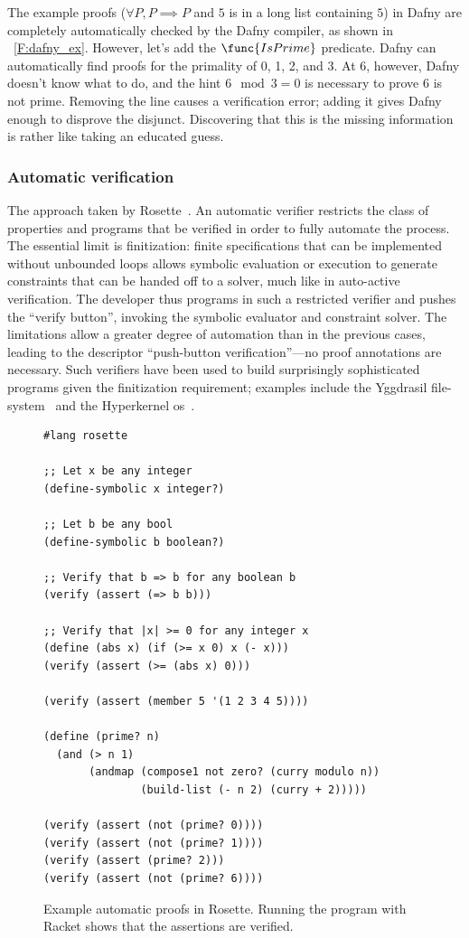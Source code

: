 The example proofs (\(\forall P, P \implies P\) and \(5\) is in a long list
containing \(5\)) in Dafny are completely automatically checked by the Dafny
compiler, as shown in \figurename~\ref{F:dafny_ex}. However, let's add the
\(\func{IsPrime}\) predicate. Dafny can automatically find proofs for the
primality of 0, 1, 2, and 3. At 6, however, Dafny doesn't know what to do, and
the hint \(6 \mod 3 = 0\) is necessary to prove 6 is not prime. Removing the
line causes a verification error; adding it gives Dafny enough to disprove the
disjunct. Discovering that this is the missing information is rather like taking
an educated guess.

\subsubsection{Automatic verification}

The approach taken by Rosette~\cite{Torlak_2013}. An automatic verifier
restricts the class of properties and programs that be verified in order to
fully automate the process. The essential limit is finitization: finite
specifications that can be implemented without unbounded loops allows symbolic
evaluation or execution to generate constraints that can be handed off to a
solver, much like in auto-active verification. The developer thus programs in
such a restricted verifier and pushes the ``verify button'', invoking the symbolic
evaluator and constraint solver. The limitations allow a greater degree of
automation than in the previous cases, leading to the descriptor ``push-button
verification''---no proof annotations are necessary. Such verifiers have been used
to build surprisingly sophisticated programs given the finitization requirement;
examples include the Yggdrasil file-system~\cite{Sigurbjarnarson_2016} and the
Hyperkernel \gls{os}~\cite{Nelson_2017}.

\begin{figure}[ht]
\begin{verbatim}
#lang rosette

;; Let x be any integer
(define-symbolic x integer?)

;; Let b be any bool
(define-symbolic b boolean?)

;; Verify that b => b for any boolean b
(verify (assert (=> b b)))

;; Verify that |x| >= 0 for any integer x
(define (abs x) (if (>= x 0) x (- x)))
(verify (assert (>= (abs x) 0)))

(verify (assert (member 5 '(1 2 3 4 5))))

(define (prime? n)
  (and (> n 1)
       (andmap (compose1 not zero? (curry modulo n))
               (build-list (- n 2) (curry + 2)))))

(verify (assert (not (prime? 0))))
(verify (assert (not (prime? 1))))
(verify (assert (prime? 2)))
(verify (assert (not (prime? 6))))
\end{verbatim}
    \caption{Example automatic proofs in Rosette. Running the program with
    Racket shows that the assertions are verified.}\label{F:rosette}
\end{figure}

